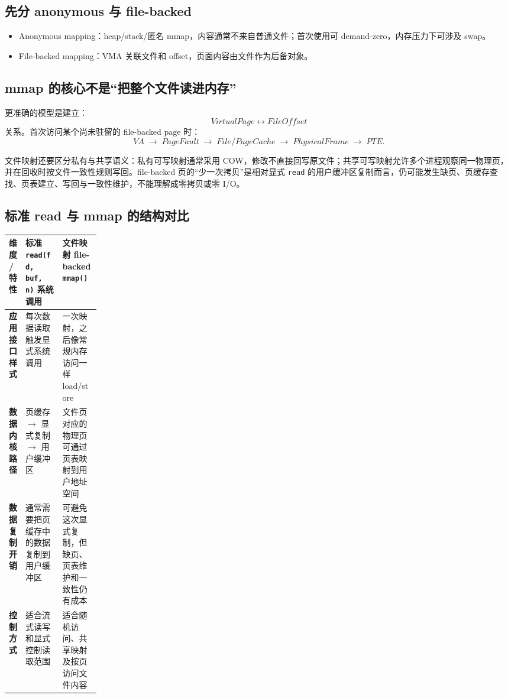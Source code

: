 \documentclass[11pt,a4paper]{ctexart}
\newcommand{\code}[1]{\texttt{#1}}
\newcommand{\arr}{\;\longrightarrow\;}
\begin{document}
\subsection{先分 anonymous 与 file-backed}
\begin{itemize}
  \item Anonymous mapping：heap/stack/匿名 mmap，内容通常不来自普通文件；首次使用可 demand-zero，内存压力下可涉及 swap。
  \item File-backed mapping：VMA 关联文件和 offset，页面内容由文件作为后备对象。
\end{itemize}

\subsection{mmap 的核心不是“把整个文件读进内存”}
更准确的模型是建立：
\[
\boxed{VirtualPage \leftrightarrow FileOffset}
\]
关系。首次访问某个尚未驻留的 file-backed page 时：
\[
VA\arr PageFault\arr File/PageCache\arr PhysicalFrame\arr PTE.
\]

文件映射还要区分私有与共享语义：私有可写映射通常采用 COW，修改不直接回写原文件；共享可写映射允许多个进程观察同一物理页，并在回收时按文件一致性规则写回。file-backed 页的“少一次拷贝”是相对显式 \code{read} 的用户缓冲区复制而言，仍可能发生缺页、页缓存查找、页表建立、写回与一致性维护，不能理解成零拷贝或零 I/O。

\subsection{标准 read 与 mmap 的结构对比}
\begingroup
\small
\renewcommand{\arraystretch}{1.25}
\setlength{\tabcolsep}{3pt}
\noindent\begin{tabularx}{\linewidth}{>{\bfseries}p{0.18\linewidth} X X}
\toprule
维度 / 特性 & 标准 \code{read(fd, buf, n)} 系统调用 & 文件映射 file-backed \code{mmap()}\\
\midrule
应用接口样式 & 每次数据读取触发显式系统调用 & 一次映射，之后像常规内存访问一样 load/store\\
数据内核路径 & 页缓存 $\rightarrow$ 显式复制 $\rightarrow$ 用户缓冲区 & 文件页对应的物理页可通过页表映射到用户地址空间\\
数据复制开销 & 通常需要把页缓存中的数据复制到用户缓冲区 & 可避免这次显式复制，但缺页、页表维护和一致性仍有成本\\
控制方式 & 适合流式读写和显式控制读取范围 & 适合随机访问、共享映射及按页访问文件内容\\
\bottomrule
\end{tabularx}
\endgroup
\end{document}
